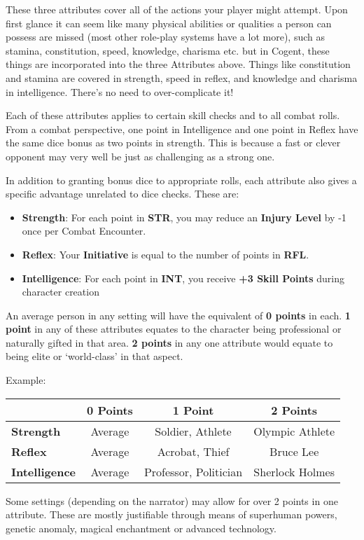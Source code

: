 These three attributes cover all of the actions your player might attempt. Upon first glance it can seem like many physical abilities or qualities a person can possess are missed (most other role-play systems have a lot more), such as stamina, constitution, speed, knowledge, charisma etc. but in Cogent, these things are incorporated into the three Attributes above. Things like constitution and stamina are covered in strength, speed in reflex, and knowledge and charisma in intelligence. There’s no need to over-complicate it!

Each of these attributes applies to certain skill checks and to all combat rolls. From a combat perspective, one point in Intelligence and one point in Reflex have the same dice bonus as two points in strength. This is because a fast or clever opponent may very well be just as challenging as a strong one.

In addition to granting bonus dice to appropriate rolls, each attribute also gives a specific advantage unrelated to dice checks. These are:

\begin{itemize}
    \item \textbf{Strength}: For each point in \textbf{STR}, you may reduce an \textbf{Injury Level} by -1 once per Combat Encounter.
    \item \textbf{Reflex}: Your \textbf{Initiative }is equal to the number of points in \textbf{RFL}.
    \item \textbf{Intelligence}: For each point in \textbf{INT}, you receive \textbf{+3 Skill Points} during character creation
\end{itemize}

An average person in any setting will have the equivalent of \textbf{0 points} in each. \textbf{1 point} in any of these attributes equates to the character being professional or naturally gifted in that area. \textbf{2 points} in any one attribute would equate to being elite or ‘world-class’ in that aspect.

Example:

\begin{center}
    \begin{tabular}{|l|c c c|} 
     \hline
       & \textbf{0 Points} & \textbf{1 Point} & \textbf{2 Points} \\ 
     \hline
     \textbf{Strength} & Average & Soldier, Athlete & Olympic Athlete \\ 
     \textbf{Reflex} & Average & Acrobat, Thief & Bruce Lee \\
     \textbf{Intelligence} & Average & Professor, Politician & Sherlock Holmes \\
     \hline
    \end{tabular}
\end{center}

Some settings (depending on the narrator) may allow for over 2 points in one attribute. These are mostly justifiable through means of superhuman powers, genetic anomaly, magical enchantment or advanced technology.
